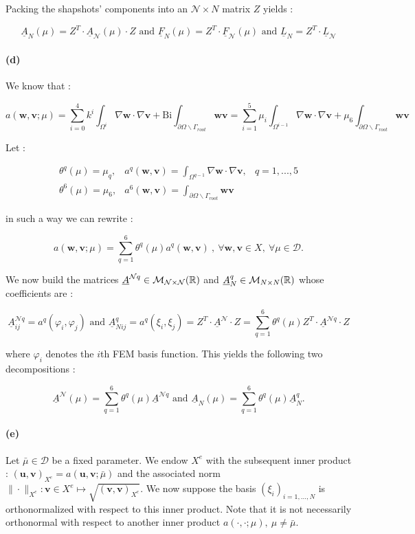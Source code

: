 \documentclass[a4paper]{article}
\newcounter{c}
\newcounter{d}
\newcounter{r}
\newcounter{e}
\newcommand{\R}{\mathbb{R}}
\newcommand{\mat}[2]{{\cal M}_{#1\times#2}(\R)}
\newcommand{\bu}{\mathbf u}
\newcommand{\bv}{\mathbf v}
\newcommand{\bw}{\mathbf w}
\begin{document}
Packing the shapshots' components into an $\mathcal N\times N$ matrix $Z$ yields :

$$\underline A_N(\mu)=Z^T\cdot\underline A_\mathcal{N}(\mu)\cdot Z\text{ and }\underline F_N(\mu)=Z^T\cdot\underline F_\mathcal{N}(\mu)\text{ and }\underline L_N=Z^T\cdot\underline L_\mathcal N$$

\paragraph{(d)}We know that :

$$a(\bw,\bv;\mu)=\sum_{i=0}^4k^i\int_{\Omega^i}\nabla\bw\cdot\nabla\bv+\text{Bi}\int_{\partial\Omega\backslash\Gamma_{root}}\bw\bv=\sum_{i=1}^5\mu_i\int_{\Omega^{i-1}}\nabla\bw\cdot\nabla\bv+\mu_6\int_{\partial\Omega\backslash\Gamma_{root}}\bw\bv$$

Let :

$$\begin{array}{llr}
\theta^q(\mu)=\mu_q,&a^q(\bw,\bv)=\int_{\Omega^{q-1}}\nabla\bw\cdot\nabla\bv,&q=1,...,5\\
\theta^6(\mu)=\mu_6,&a^6(\bw,\bv)=\int_{\partial\Omega\backslash\Gamma_{root}}\bw\bv&
\end{array}$$

in such a way we can rewrite :

$$a(\bw,\bv;\mu)=\sum_{q=1}^6\theta^q(\mu)a^q(\bw,\bv)~,~\forall\bw,\bv\in X,~\forall\mu\in\mathcal D.$$

We now build the matrices $\underline A^{\mathcal Nq}\in\mat{\mathcal N}{\mathcal N}$ and $\underline A^q_N\in\mat NN$ whose coefficients are :

$$\underline A^{\mathcal Nq}_{ij}=a^q(\varphi_i,\varphi_j)\text{ and }\underline A^q_{Nij}=a^q(\xi_i,\xi_j)=Z^T\cdot\underline A^\mathcal N\cdot Z=\sum_{q=1}^6\theta^q(\mu)Z^T\cdot\underline A^{\mathcal Nq}\cdot Z$$

where $\varphi_i$ denotes the $i$th FEM basis function. This yields the following two decompositions :

$$\underline A^\mathcal N(\mu)=\sum_{q=1}^6\theta^q(\mu)\underline A^{\mathcal Nq}\text{ and }\underline A_N(\mu)=\sum_{q=1}^6\theta^q(\mu)\underline A_N^q.$$

\paragraph{(e)}Let $\bar\mu\in\mathcal D$ be a fixed parameter. We endow $X^e$ with the subsequent inner product : $(\bu,\bv)_{X^e}=a(\bu,\bv;\bar\mu)$ and the associated norm $\|\cdot\|_{X^e}:\bv\in X^e\mapsto\sqrt{(\bv,\bv)_{X^e}}$. We now suppose the basis $(\xi_i)_{i=1,...,N}$ is orthonormalized with respect to this inner product. Note that it is not necessarily orthonormal with respect to another inner product $a(\cdot,\cdot;\mu),~\mu\neq\bar\mu$.
\end{document}
